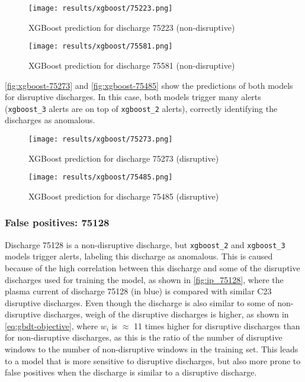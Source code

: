 \begin{figure}[H]
    \centering
    \texttt{[image: results/xgboost/75223.png]}
    \caption{XGBoost prediction for discharge 75223 (non-disruptive)}
    \label{fig:xgboost-75223}
\end{figure}

\begin{figure}[H]
    \centering
    \texttt{[image: results/xgboost/75581.png]}
    \caption{XGBoost prediction for discharge 75581 (non-disruptive)}
    \label{fig:xgboost-75581}
\end{figure}

\autoref{fig:xgboost-75273} and \autoref{fig:xgboost-75485} show the predictions of both models for disruptive discharges. In this case, both models trigger many alerts (\texttt{xgboost\_3} alerts are on top of \texttt{xgboost\_2} alerts), correctly identifying the discharges as anomalous.

\begin{figure}[H]
    \centering
    \texttt{[image: results/xgboost/75273.png]}
    \caption{XGBoost prediction for discharge 75273 (disruptive)}
    \label{fig:xgboost-75273}
\end{figure}

\begin{figure}[H]
    \centering
    \texttt{[image: results/xgboost/75485.png]}
    \caption{XGBoost prediction for discharge 75485 (disruptive)}
    \label{fig:xgboost-75485}
\end{figure}

\subsubsection{False positives: 75128}

Discharge 75128 is a non-disruptive discharge, but \texttt{xgboost\_2} and \texttt{xgboost\_3} models trigger alerts, labeling this discharge as anomalous. This is caused because of the high correlation between this discharge and some of the disruptive discharges used for training the model, as shown in \autoref{fig:ip_75128}, where the plasma current of discharge 75128 (in blue) is compared with similar C23 disruptive discharges. Even though the discharge is also similar to some of non-disruptive discharges, weigh of the disruptive discharges is higher, as shown in \autoref{eq:gbdt-objective}, where $w_i$ is $\approx$ 11 times higher for disruptive discharges than for non-disruptive discharges, as this is the ratio of the number of disruptive windows to the number of non-disruptive windows in the training set. This leads to a model that is more sensitive to disruptive discharges, but also more prone to false positives when the discharge is similar to a disruptive discharge. 

